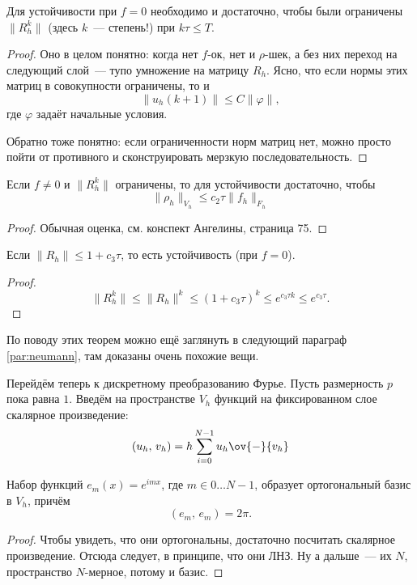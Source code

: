 \documentclass{trlnotes}
\begin{document}
    \begin{thm} \label{thm:stab-1}
        Для устойчивости при $f = 0$ необходимо и достаточно, чтобы были ограничены $\|R_h^k\|$ (здесь $k$~--- степень!) при $k\tau \leqslant T$.
        \begin{proof}
            Оно в целом понятно: когда нет $f$-ок, нет и $\rho$-шек, а без них переход на следующий слой~--- тупо умножение на матрицу $R_h$. Ясно, что если нормы этих матриц в совокупности ограничены, то и
            \[
                \|u_h(k+1)\| \leqslant C \|\varphi\|,
            \]
            где $\varphi$ задаёт начальные условия.

            Обратно тоже понятно: если ограниченности норм матриц нет, можно просто пойти от противного и сконструировать мерзкую последовательность.
        \end{proof}
    \end{thm}

    \begin{thm}
        Если $f \neq 0$ и $\|R_h^k\|$ ограничены, то для устойчивости достаточно, чтобы
        \[
            \|\rho_h\|_{V_h} \leqslant c_2 \tau \|f_h\|_{F_h}
        \]
        \begin{proof}
            Обычная оценка, см. конспект Ангелины, страница 75.
        \end{proof}
    \end{thm}

    \begin{cor}
        Если $\|R_h\| \leqslant 1 + c_3\tau$, то есть устойчивость (при $f = 0$).
        \begin{proof}
            \[
                \|R_h^k\| \leqslant \|R_h\|^k \leqslant (1 + c_3 \tau)^k \leqslant e^{c_3 \tau k} \leqslant e^{c_3 \tau}.
            \]
        \end{proof}
    \end{cor}

    По поводу этих теорем можно ещё заглянуть в следующий параграф \ref{par:neumann}, там доказаны очень похожие вещи.

    Перейдём теперь к дискретному преобразованию Фурье. Пусть размерность $p$ пока равна $1$. Введём на пространстве $V_h$ функций на фиксированном слое скалярное произведение:
    \[
        (u_h, \, v_h) = h \sum\limits_{i = 0}^{N - 1} u_h \ov{-}{v_h}
    \]

    \begin{st}
        Набор функций $e_m(x) = e^{imx}$, где $m \in 0\ldots N-1$, образует ортогональный базис в $V_h$, причём
        \[
            (e_m, \, e_m) = 2\pi.
        \]
        \begin{proof}
            Чтобы увидеть, что они ортогональны, достаточно посчитать скалярное произведение. Отсюда следует, в принципе, что они ЛНЗ. Ну а дальше~--- их $N$, пространство $N$-мерное, потому и базис.
        \end{proof}
    \end{st}
\end{document}
